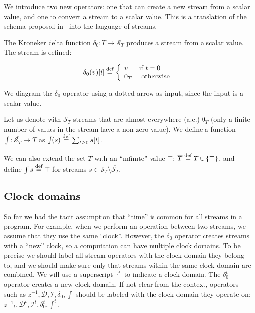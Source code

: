 \documentclass[10pt]{article}
\newcommand{\stream}[1]{\ensuremath{\mathcal{S}_{#1}}}
\newcommand{\streamf}[1]{\ensuremath{\overline{\mathcal{S}_{#1}}}}
\newcommand{\zm}{\ensuremath{z^{-1}}} %
\newcommand{\I}{\mathcal{I}}  %
\newcommand{\D}{\mathcal{D}}  %
\newcommand{\defn}{\stackrel{\textrm{\scriptsize def}}{=}}
\begin{document}
We introduce two new operators: one that can create a new stream from
a scalar value, and one to convert a stream to a scalar value.  This
is a translation of the schema proposed in~\cite{abadi-fossacs15} into
the language of streams.

The Kroneker delta function $\delta_0 : T \rightarrow \stream{T}$
produces a stream from a scalar value.  The stream is
defined:

$$\delta_0(v)[t] \defn \left\{
\begin{array}{ll}
  v & \mbox{if } t = 0 \\
  0_T & \mbox{ otherwise}
\end{array}
\right.
$$

We diagram the $\delta_0$ operator using a dotted arrow as input, since
the input is a scalar value.


Let us denote with $\streamf{T}$ streams that are almost everywhere
(a.e.)  $0_T$ (only a finite number of values in the stream have a
non-zero value).  We define a function $\int : \streamf{T} \rightarrow
T$ as $\int(s) \defn \sum_{t \geq 0} s[t]$.

We can also extend the set $T$ with an ``infinite'' value $\top$:
$\overline{T} \defn T \cup \{ \top \}$, and define $\int{s} \defn
\top$ for streams $s \in \stream{T} \setminus \streamf{T}$.


\subsection{Clock domains}

So far we had the tacit assumption that ``time'' is common for all
streams in a program.  For example, when we perform an operation
between two streams, we assume that they use the same ``clock''.
However, the $\delta_0$ operator creates streams with a ``new'' clock,
so a computation can have multiple clock domains.  To be precise we
should label all stream operators with the clock domain they belong
to, and we should make sure only that streams within the same clock
domain are combined.  We will use a superscript $\cdot^t$ to indicate
a clock domain.  The $\delta_0^t$ operator creates a new clock domain.
If not clear from the context, operators such as $\zm, \D, \I,
\delta_0, \int$ should be labeled with the clock domain they operate
on: $\zm_t, \D^t, \I^t, \delta_0^t, \int^t$.
\end{document}
